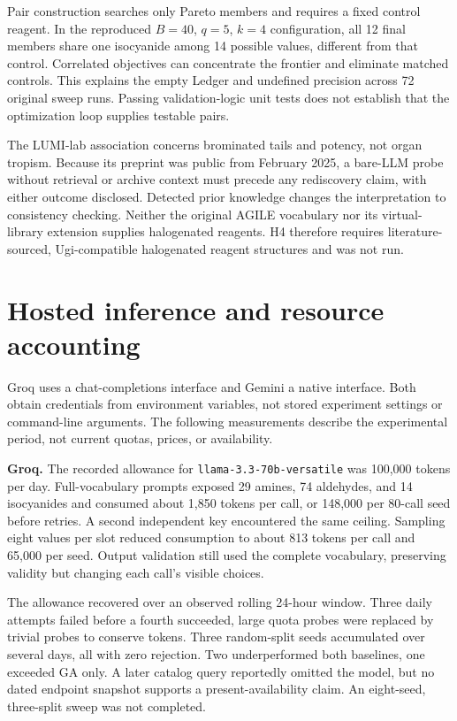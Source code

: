 Pair construction searches only Pareto members and requires a fixed control reagent. In the reproduced $B=40$, $q=5$, $k=4$ configuration, all 12 final members share one isocyanide among 14 possible values, different from that control. Correlated objectives can concentrate the frontier and eliminate matched controls. This explains the empty Ledger and undefined precision across 72 original sweep runs. Passing validation-logic unit tests does not establish that the optimization loop supplies testable pairs.

The LUMI-lab association concerns brominated tails and potency, not organ tropism. Because its preprint was public from February 2025, a bare-LLM probe without retrieval or archive context must precede any rediscovery claim, with either outcome disclosed. Detected prior knowledge changes the interpretation to consistency checking. Neither the original AGILE vocabulary nor its virtual-library extension supplies halogenated reagents. H4 therefore requires literature-sourced, Ugi-compatible halogenated reagent structures and was not run.

\section{Hosted inference and resource accounting}
\label{app:hosted}
Groq uses a chat-completions interface and Gemini a native interface. Both obtain credentials from environment variables, not stored experiment settings or command-line arguments. The following measurements describe the experimental period, not current quotas, prices, or availability.

\textbf{Groq.} The recorded allowance for \texttt{llama-3.3-70b-versatile} was 100,000 tokens per day. Full-vocabulary prompts exposed 29 amines, 74 aldehydes, and 14 isocyanides and consumed about 1,850 tokens per call, or 148,000 per 80-call seed before retries. A second independent key encountered the same ceiling. Sampling eight values per slot reduced consumption to about 813 tokens per call and 65,000 per seed. Output validation still used the complete vocabulary, preserving validity but changing each call's visible choices.

The allowance recovered over an observed rolling 24-hour window. Three daily attempts failed before a fourth succeeded, large quota probes were replaced by trivial probes to conserve tokens. Three random-split seeds accumulated over several days, all with zero rejection. Two underperformed both baselines, one exceeded GA only. A later catalog query reportedly omitted the model, but no dated endpoint snapshot supports a present-availability claim. An eight-seed, three-split sweep was not completed.

